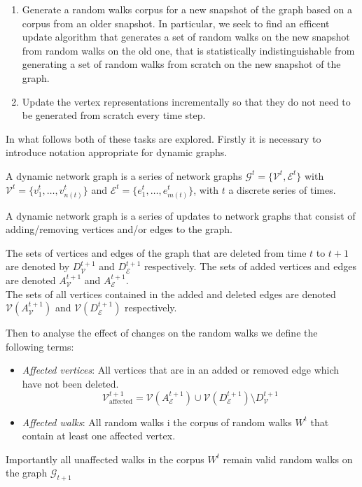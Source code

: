 \documentclass[a4paper]{article}
\renewcommand{\G}{\mathcal G}
\renewcommand{\V}{\mathcal V}
\begin{document}
\begin{enumerate}
\item Generate a random walks corpus for a new snapshot of the graph based on
  a corpus from an older snapshot. In particular,
  we seek to find an efficent update algorithm that generates a set of random
  walks on the new snapshot from random walks on the old one, that is
  statistically indistinguishable from generating a set of random walks from
  scratch on the new snapshot of the graph.
  
\item  Update the vertex representations incrementally so that they do not need
  to be generated from scratch every time step.
  
\end{enumerate}
In what follows both of these tasks are explored. Firstly it is necessary to introduce notation appropriate for dynamic graphs.
\begin{definition}
A dynamic network graph is a series of network graphs $\G^t = \{\V^t,
  \mathcal{E}^t\}$ with $\V^t = \{v_1^t, \dots, v_{n(t)}^t\}$ and $\mathcal{E}^t = \{e_1^t, \dots,
  e_{m(t)}^t\}$, with $t$ a discrete series of times.
\end{definition}
A dynamic network graph is a series of updates to network graphs that consist of
adding/removing vertices and/or edges to the graph.
\begin{definition}
  The sets of vertices and edges of the graph that are deleted from time $t$
  to $t+1$ are denoted by $D_{\V}^{t+1}$ and $D_{\mathcal{E}}^{t+1}$ respectively. The
  sets of added vertices and edges are denoted $A_{\V}^{t+1}$ and
  $A_{\mathcal{E}}^{t+1}$.\\
  The sets of all vertices contained in the added and deleted edges are denoted
  $\V(A_{\V}^{t+1})$ and $\V(D_{\mathcal{E}}^{t+1})$ respectively.
\end{definition}
Then to analyse the effect of changes on the random walks we define the
following terms:
\begin{itemize}
  \item \textit{Affected vertices}: All vertices that are in an added or removed
    edge which have not been deleted.
    \[\V_{\text{affected}}^{t+1} = \V(A_{\mathcal{E}}^{t+1}) \cup
      \V(D_{\mathcal{E}}^{t+1}) \setminus D_{\V}^{t+1}\]
    \item \textit{Affected walks}: All random walks i the corpus of random walks
      $W^t$ that contain at least one affected vertex.
    \end{itemize}
Importantly all unaffected walks in the corpus $W^t$ remain valid random walks
on the graph $\G_{t+1}$
\end{document}
